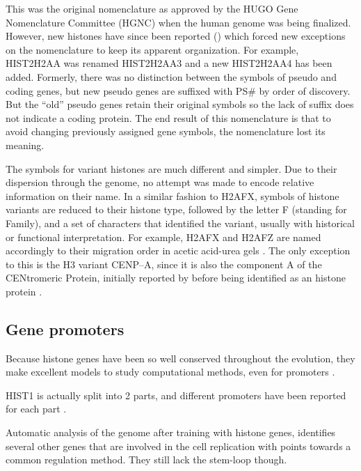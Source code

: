     This was the original nomenclature as approved by the HUGO Gene Nomenclature Committee (HGNC)
    when the human genome was being finalized. However, new histones have since been
    reported () which forced new exceptions on the
    nomenclature to keep its apparent organization. For example, HIST2H2AA was renamed
    HIST2H2AA3 and a new HIST2H2AA4 has been added. Formerly, there was no distinction
    between the symbols of pseudo and coding genes, but new pseudo genes are suffixed with
    PS\# by order of discovery. But the ``old'' pseudo genes retain their original symbols
    so the lack of suffix does not indicate a coding protein.
    The end result of this nomenclature is that to avoid changing previously
    assigned gene symbols, the nomenclature lost its meaning. 

    The symbols for variant histones are much different and simpler. Due to their dispersion
    through the genome, no attempt was made to encode relative information on their name. In
    a similar fashion to H2AFX, symbols of histone variants are reduced to their histone type,
    followed by the letter F (standing for Family), and a set of characters that identified
    the variant, usually with historical or functional interpretation. For example, H2AFX and
    H2AFZ are named accordingly to their migration order in acetic acid-urea gels
    \citep{HTwoA-first-variants}.
    The only exception to this is the H3 variant CENP--A, since it is also the component A
    of the CENtromeric Protein, initially reported by \cite{CENPA-first-report} before being
    identified as an histone protein \citep{CENPA-copurifies-histones, CENPA-sequence-analysis}.



  \subsection{Gene promoters}

    Because histone genes have been so well conserved throughout the evolution, they make
    excellent models to study computational methods, even for promoters
    \citep{histone-promoter-modeling}.

    HIST1 is actually split into 2 parts, and different promoters have been reported for each
    part \citep{HISTOne-different-transcripts}.

    Automatic analysis of the genome after training with histone genes, identifies
    several other genes that are involved in the cell replication with points
    towards a common regulation method. They still lack the stem-loop though.

